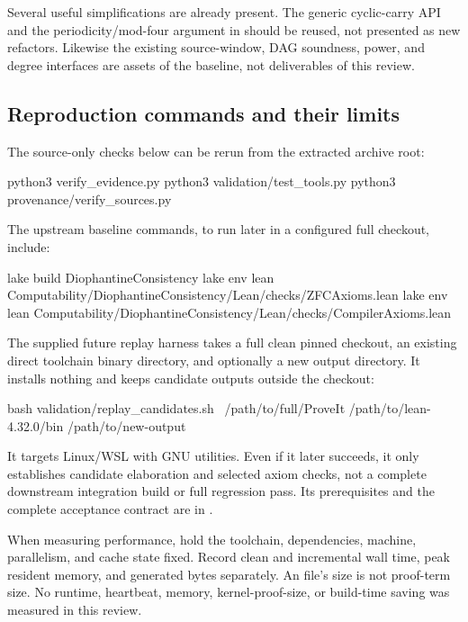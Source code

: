 Several useful simplifications are already present. The generic cyclic-carry
API and the periodicity/mod-four argument in
 should be reused, not presented as
new refactors. Likewise the existing source-window, DAG soundness, power,
and degree interfaces are assets of the baseline, not deliverables of this
review.

\subsection{Reproduction commands and their limits}

The source-only checks below can be rerun from the extracted archive root:

\begin{Lean}
python3 verify_evidence.py
python3 validation/test_tools.py
python3 provenance/verify_sources.py
\end{Lean}

The upstream baseline commands, to run later in a configured full checkout,
include:

\begin{Lean}
lake build DiophantineConsistency
lake env lean Computability/DiophantineConsistency/Lean/checks/ZFCAxioms.lean
lake env lean Computability/DiophantineConsistency/Lean/checks/CompilerAxioms.lean
\end{Lean}

The supplied future replay harness takes a full clean pinned checkout,
an existing direct toolchain binary directory, and optionally a new output
directory. It installs nothing and keeps candidate outputs outside the
checkout:

\begin{Lean}
bash validation/replay_candidates.sh \
  /path/to/full/ProveIt /path/to/lean-4.32.0/bin /path/to/new-output
\end{Lean}

It targets Linux/WSL with GNU utilities. Even if it later succeeds, it only
establishes candidate elaboration and selected axiom checks, not a complete
downstream integration build or full regression pass. Its prerequisites and
the complete acceptance contract are in \pathcode{validation/README.md}.

When measuring performance, hold the toolchain, dependencies, machine,
parallelism, and cache state fixed. Record clean and incremental wall time,
peak resident memory, and generated bytes separately. An \code{.olean}
file's size is not proof-term size. No runtime, heartbeat, memory,
kernel-proof-size, or build-time saving was measured in this review.
